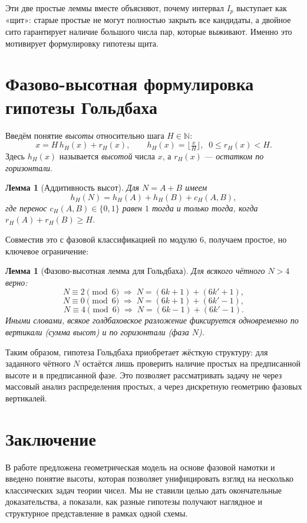 \documentclass[12pt,a4paper]{article}
\theoremstyle{definition}
\theoremstyle{plain}
\newtheorem{lemma}[definition]{Лемма}
\theoremstyle{remark}
\begin{document}
Эти две простые леммы вместе объясняют, почему интервал $I_p$ выступает как «щит»: старые простые не могут полностью закрыть все кандидаты, а двойное сито гарантирует наличие большого числа пар, которые выживают. Именно это мотивирует формулировку гипотезы щита.

\section{Фазово-высотная формулировка гипотезы Гольдбаха}

Введём понятие \emph{высоты} относительно шага $H\in\mathbb{N}$:
\[
x = H\,h_H(x) + r_H(x), \qquad h_H(x)=\Big\lfloor \tfrac{x}{H}\Big\rfloor,\;\;0\le r_H(x)<H.
\]
Здесь $h_H(x)$ называется \emph{высотой} числа $x$, а $r_H(x)$ — \emph{остатком по горизонтали}.

\begin{lemma}[Аддитивность высот]
Для $N=A+B$ имеем
\[
h_H(N) = h_H(A)+h_H(B)+c_H(A,B),
\]
где перенос $c_H(A,B)\in\{0,1\}$ равен $1$ тогда и только тогда, когда $r_H(A)+r_H(B)\ge H$.
\end{lemma}

Совместив это с фазовой классификацией по модулю $6$, получаем простое, но ключевое ограничение:

\begin{lemma}[Фазово-высотная лемма для Гольдбаха]
Для всякого чётного $N>4$ верно:
\[
N \equiv 2 \pmod{6} \;\Rightarrow\; N=(6k+1)+(6k'+1),
\]
\[
N \equiv 0 \pmod{6} \;\Rightarrow\; N=(6k+1)+(6k'-1),
\]
\[
N \equiv 4 \pmod{6} \;\Rightarrow\; N=(6k-1)+(6k'-1).
\]
Иными словами, всякое голдбаховское разложение фиксируется одновременно по вертикали (сумма высот)
и по горизонтали (фаза $N$).
\end{lemma}

Таким образом, гипотеза Гольдбаха приобретает жёсткую структуру: для заданного чётного $N$ остаётся лишь
проверить наличие простых на предписанной высоте и в предписанной фазе. Это позволяет рассматривать задачу
не через массовый анализ распределения простых, а через дискретную геометрию фазовых вертикалей.

\section*{Заключение}
В работе предложена геометрическая модель на основе фазовой намотки и введено понятие высоты, 
которая позволяет унифицировать взгляд на несколько классических задач теории чисел. 
Мы не ставили целью дать окончательные доказательства, а показали, как разные гипотезы 
получают наглядное и структурное представление в рамках одной схемы.
\end{document}
